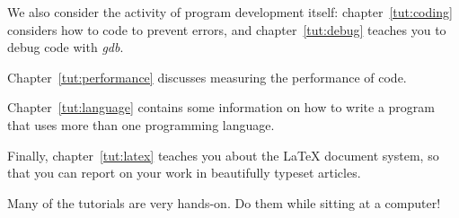 We also consider the activity of program development itself:
chapter~\ref{tut:coding} considers how to code to prevent errors, and
chapter~\ref{tut:debug} teaches you to debug code with
\emph{gdb}. 
\begin{notready}
Chapter~\ref{tut:performance} discusses measuring the
performance of code.
\end{notready}
Chapter~\ref{tut:language} contains some information on
how to write a program that uses more than one programming language.

Finally, chapter~\ref{tut:latex} teaches you about the \LaTeX{}
document system, so that you can report on your work in beautifully
typeset articles.

Many of the tutorials are very hands-on. Do them while sitting at a
computer!
